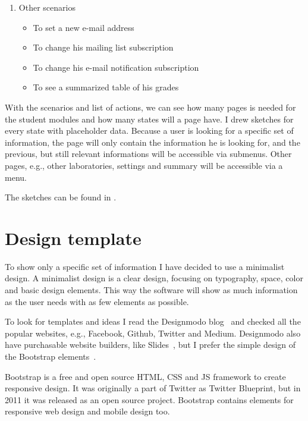 \begin{enumerate}
	\item Other scenarios
	\begin{itemize}
		\item To set a new e-mail address
		\item To change his mailing list subscription
		\item To change his e-mail notification subscription
		\item To see a summarized table of his grades
	\end{itemize}
	
\end{enumerate}

With the scenarios and list of actions, we can see how many pages is needed for the student modules and how many states will a page have. I drew sketches for every state with placeholder data. Because a user is looking for a specific set of information, the page will only contain the information he is looking for, and the previous, but still relevant informations will be accessible via submenus. Other pages, e.g., other laboratories, settings and summary will be accessible via a menu.


The sketches can be found in .

\section{Design template}

To show only a specific set of information I have decided to use a minimalist design. A minimalist design is a clear design, focusing on typography, space, color and basic design elements. This way the software will show as much information as the user needs with as few elements as possible. 

To look for templates and ideas I read the Designmodo blog~\cite{Designmodo} and checked all the popular websites, e.g., Facebook, Github, Twitter and Medium. Designmodo also have purchasable website builders, like Slides~\cite{Designmodo-slides}, but I prefer the simple design of the Bootstrap elements~\cite{Bootstrap}. 

Bootstrap is a free and open source HTML, CSS and JS framework to create responsive design. It was originally a part of Twitter as Twitter Blueprint, but in 2011 it was released as an open source project. Bootstrap contains elements for responsive web design and mobile design too.


